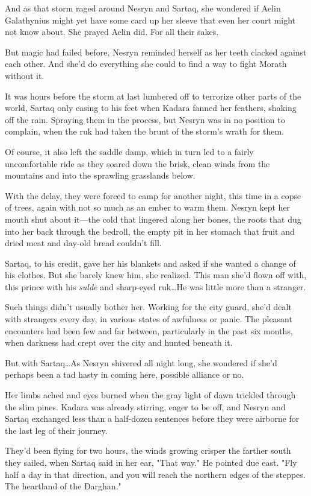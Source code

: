 And as that storm raged around Nesryn and Sartaq, she wondered if Aelin Galathynius might yet have some card up her sleeve that even her court might not know about.
She prayed Aelin did.
For all their sakes.

But magic had failed before, Nesryn reminded herself as her teeth clacked against each other.
And she'd do everything she could to find a way to fight Morath without it.

It was hours before the storm at last lumbered off to terrorize other parts of the world, Sartaq only easing to his feet when Kadara fanned her feathers, shaking off the rain.
Spraying them in the process, but Nesryn was in no position to complain, when the ruk had taken the brunt of the storm's wrath for them.

Of course, it also left the saddle damp, which in turn led to a fairly uncomfortable ride as they soared down the brisk, clean winds from the mountains and into the sprawling grasslands below.

With the delay, they were forced to camp for another night, this time in a copse of trees, again with not so much as an ember to warm them.
Nesryn kept her mouth shut about it---the cold that lingered along her bones, the roots that dug into her back through the bedroll, the empty pit in her stomach that fruit and dried meat and day-old bread couldn't fill.

Sartaq, to his credit, gave her his blankets and asked if she wanted a change of his clothes.
But she barely knew him, she realized.
This man she'd flown off with, this prince with his \emph{sulde} and sharp-eyed ruk\ldots He was little more than a stranger.

Such things didn't usually bother her.
Working for the city guard, she'd dealt with strangers every day, in various states of awfulness or panic.
The pleasant encounters had been few and far between, particularly in the past six months, when darkness had crept over the city and hunted beneath it.

But with Sartaq\ldots As Nesryn shivered all night long, she wondered if she'd perhaps been a tad hasty in coming here, possible alliance or no.

Her limbs ached and eyes burned when the gray light of dawn trickled through the slim pines.
Kadara was already stirring, eager to be off, and Nesryn and Sartaq exchanged less than a half-dozen sentences before they were airborne for the last leg of their journey.

They'd been flying for two hours, the winds growing crisper the farther south they sailed, when Sartaq said in her ear, "That way."
He pointed due east.
"Fly half a day in that direction, and you will reach the northern edges of the steppes.
The heartland of the Darghan."

